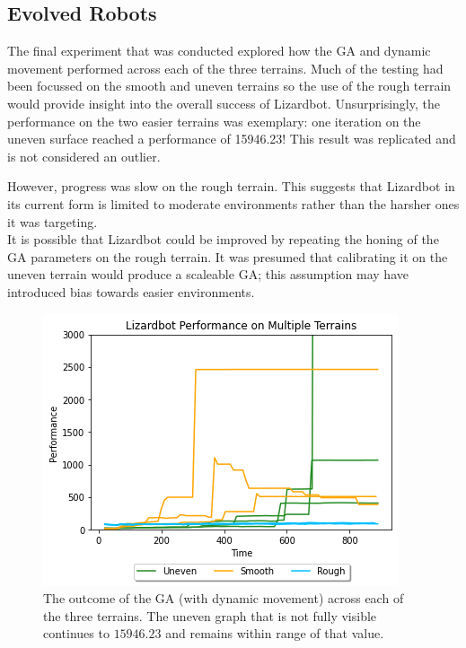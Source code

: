 \documentclass{article}
\begin{document}
\subsection{Evolved Robots}
\label{sec:Robot Res}
The final experiment that was conducted explored how the GA and dynamic movement performed across each of the three terrains. Much of the testing had been focussed on the smooth and uneven terrains so the use of the rough terrain would provide insight into the overall success of Lizardbot. Unsurprisingly, the performance on the two easier terrains was exemplary: one iteration on the uneven surface reached a performance of 15946.23!  This result was replicated and is not considered an outlier.

However, progress was slow on the rough terrain. This suggests that Lizardbot in its current form is limited to moderate environments rather than the harsher ones it was targeting. \\

It is possible that Lizardbot could be improved by repeating the honing of the GA parameters on the rough terrain. It was presumed that calibrating it on the uneven terrain would produce a scaleable GA; this assumption may have introduced bias towards easier environments.  
\begin{figure}[H]
\centering
\includegraphics[scale=0.8]{multipleTerrains}
\caption{The outcome of the GA (with dynamic movement) across each of the three terrains. The uneven graph that is not fully visible continues to $15946.23$ and remains within range of that value.}
\end{figure}
\end{document}
